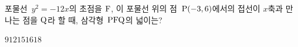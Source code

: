 포물선~$y^2=-12x$의 초점을 $\mathrm{F}$, 이 포물선 위의 점~$\mathrm{P}(-3{,}\mkern3mu\mathopen{}6)$에서의 접선이 $x$축과 만나는 점을 $\mathrm{Q}$라 할 때, 삼각형~$\mathrm{PFQ}$의 넓이는?
\begin{choices32}{$9$}{$12$}{$15$}{$16$}{$18$}\end{choices32}
